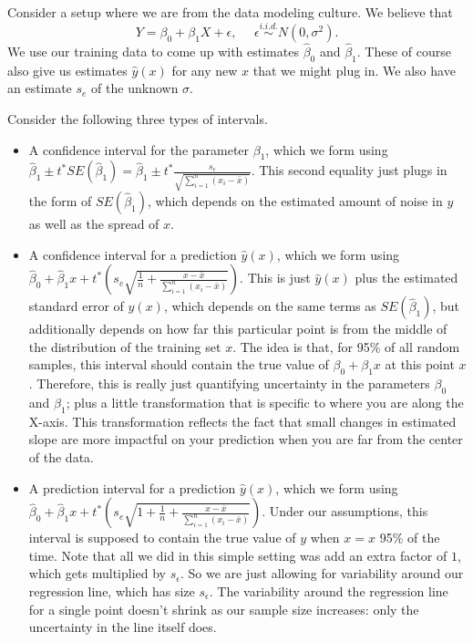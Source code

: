 Consider a setup where we are from the data modeling culture. We believe that
$$
Y = \beta_0 + \beta_1 X + \epsilon, \ \ \ \ \ \ \epsilon \overset{i.i.d.}{\sim} N(0, \sigma^2). 
$$
We use our training data to come up with estimates $\hat{\beta}_0$ and $\hat{\beta}_1$. These of course also give us estimates $\hat{y}(x)$ for any new $x$ that we might plug in. We also have an estimate $s_e$ of the unknown $\sigma$. 

Consider the following three types of intervals.

\begin{itemize}
\item A confidence interval for the parameter $\beta_1$, which we form using $\hat{\beta}_1 \pm t^* SE(\hat{\beta}_1) = \hat{\beta}_1 \pm t^* \frac{s_\epsilon}{\sqrt{\sum_{i=1}^n (x_i - \bar{x})}}$. This second equality just plugs in the form of $SE(\hat{\beta}_1)$, which depends on the estimated amount of noise in $y$ as well as the spread of $x$. 
\item A confidence interval for a prediction $\hat{y}(x)$, which we form using $\hat{\beta}_0 + \hat{\beta}_1 x + t^* \left( s_e \sqrt{\frac{1}{n} + \frac{x - \bar{x}}{\sum_{i=1}^n (x_i - \bar{x})}}\right)$. This is just $\hat{y}(x)$ plus the estimated standard error of $\hat{y}(x)$, which depends on the same terms as $SE(\hat{\beta}_1)$, but additionally depends on how far this particular point is from the middle of the distribution of the training set $x$. The idea is that, for 95\% of all random samples, this interval should contain the true value of $\beta_0 + \beta_1 x$ at this point $x$. Therefore, this is really just quantifying uncertainty in the parameters $\beta_0$ and $\beta_1$; plus a little transformation that is specific to where you are along the X-axis. This transformation reflects the fact that small changes in estimated slope are more impactful on your prediction when you are far from the center of the data. 
\item A prediction interval for a prediction $\hat{y}(x)$, which we form using $\hat{\beta}_0 + \hat{\beta}_1 x + t^* \left( s_e \sqrt{1 + \frac{1}{n} + \frac{x - \bar{x}}{\sum_{i=1}^n (x_i - \bar{x})}}\right)$. Under our assumptions, this interval is supposed to contain the true value of $y$ when $x=x$ 95\% of the time. Note that all we did in this simple setting was add an extra factor of $1$, which gets multiplied by $s_\epsilon$. So we are just allowing for variability around our regression line, which has size $s_\epsilon$. The variability around the regression line for a single point doesn't shrink as our sample size increases: only the uncertainty in the line itself does.
\end{itemize}

